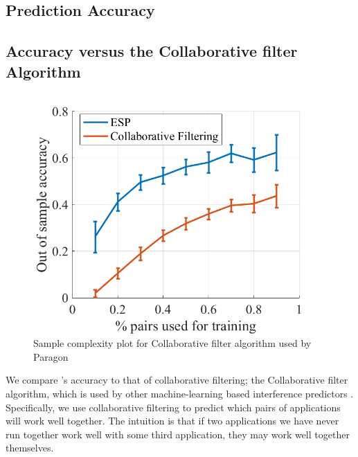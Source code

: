 \subsection{\SYSTEM{} Prediction Accuracy}
\label{sec:st_model}


\subsection{\SYSTEM{} Accuracy versus the Collaborative filter Algorithm}
\begin{figure}[!t]
  \begin{centering}
 \includegraphics[width=0.5\columnwidth]{figures/accuracy_netflix_vs_esp.png}
 \caption{Sample complexity plot for Collaborative filter algorithm used by Paragon}
 \end{centering}
\label{fig:netlix}
\end{figure}
We compare \SYSTEM{}'s accuracy to that of collaborative filtering;
\eg{} the Collaborative filter algorithm, which is used by other machine-learning
based interference predictors \cite{paragon,quasar}.  Specifically, we
use collaborative filtering to predict which pairs of applications
will work well together.  The intuition is that if two applications we
have never run together work well with some third application, they
may work well together themselves.

